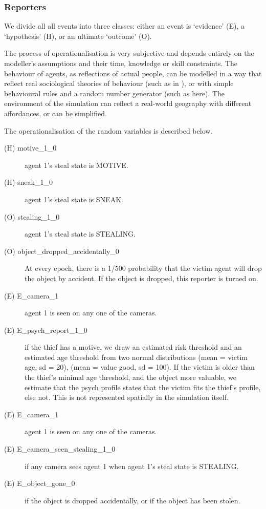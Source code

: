 \documentclass[12pt]{article}
\begin{document}
\subsubsection{Reporters}
We divide all all events into three classes: either an event is `evidence' (E), a `hypothesis' (H), or an ultimate `outcome' (O). 

The process of operationalisation is very subjective and depends entirely on the modeller's assumptions and their time, knowledge or skill constraints. The behaviour of agents, as reflections of actual people, can be modelled in a way that reflect real sociological theories of behaviour (such as in \citet{Gerritsen2015}), or with simple behavioural rules and a random number generator (such as here). The environment of the simulation can reflect a real-world geography with different affordances, or can be simplified. 

The operationalisation of the random variables is described below. 
\begin{description}
\item[(H) motive\_1\_0 ] agent 1's steal state is MOTIVE.
\item[(H) sneak\_1\_0 ] agent 1's steal state is SNEAK.
\item[(O) stealing\_1\_0 ] agent 1's steal state is STEALING.
\item[(O) object\_dropped\_accidentally\_0 ] At every epoch, there is a 1/500 probability that the victim agent will drop the object by accident. If the object is dropped, this reporter is turned on.
\item[(E) E\_camera\_1 ] agent 1 is seen on any one of the cameras.
\item[(E) E\_psych\_report\_1\_0 ] if the thief has a motive, we draw an estimated risk threshold and an estimated age threshold from two normal distributions (mean = victim age, sd = 20), (mean = value good, sd = 100). If the victim is older than the thief's minimal age threshold, and the object more valuable, we estimate that the psych profile states that the victim fits the thief's profile, else not. This is not represented spatially in the simulation itself.
\item[(E) E\_camera\_1 ] agent 1 is seen on any one of the cameras.
\item[(E) E\_camera\_seen\_stealing\_1\_0 ]  if any camera sees agent 1 when agent 1's steal state is STEALING.
\item[(E) E\_object\_gone\_0 ] if the object is dropped accidentally, or if the object has been stolen.
\end{description}
\end{document}

